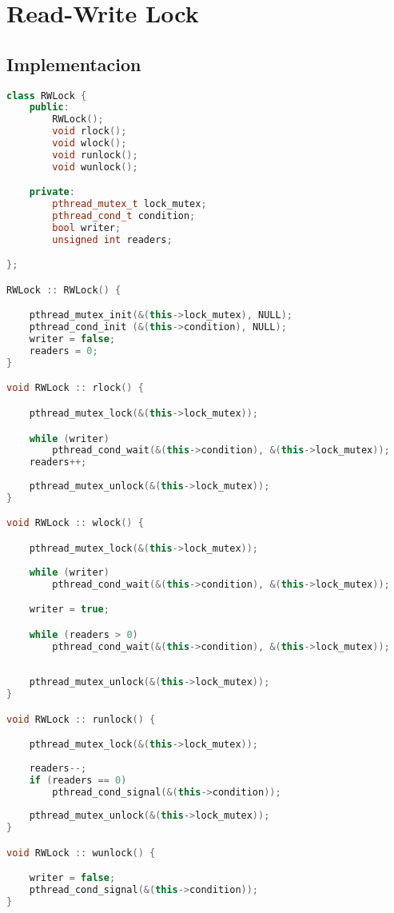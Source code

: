 \section{Read-Write Lock}

\subsection{Implementacion}
\begin{lstlisting}[language=C++, breaklines=true]
class RWLock {
    public:
        RWLock();
        void rlock();
        void wlock();
        void runlock();
        void wunlock();

    private:
	    pthread_mutex_t lock_mutex;
	    pthread_cond_t condition;	
	    bool writer;
	    unsigned int readers;

};

RWLock :: RWLock() {

	pthread_mutex_init(&(this->lock_mutex), NULL);
	pthread_cond_init (&(this->condition), NULL);
	writer = false;
	readers = 0;
}

void RWLock :: rlock() {

	pthread_mutex_lock(&(this->lock_mutex));

	while (writer) 
		pthread_cond_wait(&(this->condition), &(this->lock_mutex));
	readers++;
	
	pthread_mutex_unlock(&(this->lock_mutex));
}

void RWLock :: wlock() {

	pthread_mutex_lock(&(this->lock_mutex));
	
	while (writer)
		pthread_cond_wait(&(this->condition), &(this->lock_mutex));

	writer = true;

	while (readers > 0) 
		pthread_cond_wait(&(this->condition), &(this->lock_mutex));
	
	
	pthread_mutex_unlock(&(this->lock_mutex));
}

void RWLock :: runlock() {

	pthread_mutex_lock(&(this->lock_mutex));
	
	readers--;
	if (readers == 0)
		pthread_cond_signal(&(this->condition));
	
	pthread_mutex_unlock(&(this->lock_mutex));
}

void RWLock :: wunlock() {

	writer = false;
	pthread_cond_signal(&(this->condition));
}
\end{lstlisting}